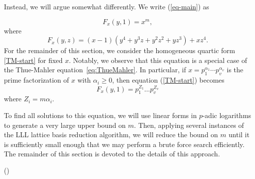  
 
 Instead, we will argue somewhat differently. We write (\ref{eq-main}) as
 
 \begin{equation} \label{TM-start}
 F_x(y,1) = x^m,
 \end{equation}
 where
 $$
 F_x(y,z) = (x-1)(y^4 + y^3z + y^2z^2 + yz^3) + xz^4.
 $$
For the remainder of this section, we consider the homogeneous quartic form \eqref{TM-start} for fixed $x$. Notably, we observe that this equation is a special case of the Thue-Mahler equation~\eqref{eq:ThueMahler}. In particular, if $x = p_1^{\alpha_1}\cdots p_v^{\alpha_v}$ is the prime factorization of $x$ with $\alpha_i \geq 0$, then equation (\ref{TM-start}) becomes 
\begin{equation}\label{Eq:main}
F_x(y,1) =  p_1^{Z_1}\dots p_v^{Z_v}
\end{equation}
where $Z_i = m\alpha_i$. 

To find all solutions to this equation, we will use linear forms in $p$-adic logarithms to generate a very large upper bound on $m$. Then, applying several instances of the LLL lattice basis reduction algorithm, we will reduce the bound on $m$ until it is sufficiently small enough that we may perform a brute force search efficiently. The remainder of this section is devoted to the details of this approach.

()


